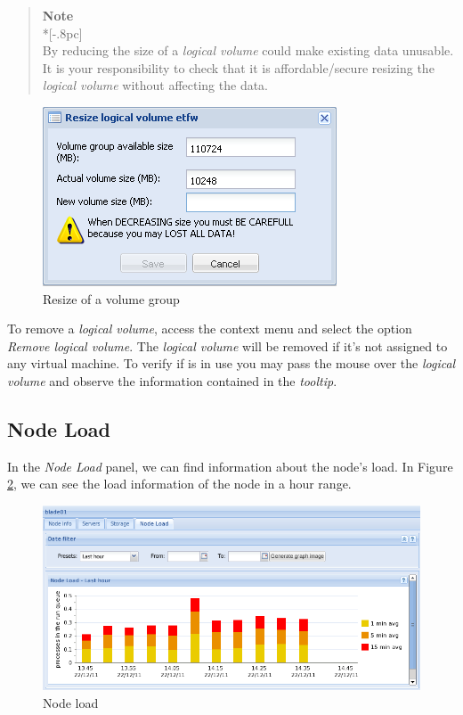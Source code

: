 \begin{quote}
	{\large \bf Note} \\*[-.8pc]
	\underline{\hspace{6in}} \\
    By reducing the size of a \emph{logical volume} could make existing data unusable. It is your responsibility to check that it is affordable/secure resizing the \emph{logical volume} without affecting the data.
\end{quote}


\begin{figure}[H]
        \begin{center}
        \includegraphics[scale=0.5]{screenshots/storage_lv_resize.png}
        \caption{Resize of a volume group}
        \label{fig:storage_lv_resize}
        \end{center}
\end{figure}

To remove a \emph{logical volume}, access the context menu and select the option \emph{Remove logical volume}. The \emph{logical volume} will be removed if it's not assigned to any virtual machine. To verify if is in use you may pass the mouse over the \emph{logical volume} and observe the information contained in the \emph{tooltip}.


\subsection{Node Load}
\label{sec:nodeload}
In the \emph{Node Load} panel, we can find information about the node's load. In Figure \ref{fig:node_load}, we can see the load information of the node in a hour range.



\begin{figure}[H]
        \begin{center}
        \includegraphics[scale=0.6]{screenshots/node_load.png}
        \caption{Node load}
        \label{fig:node_load}
        \end{center}
\end{figure}

